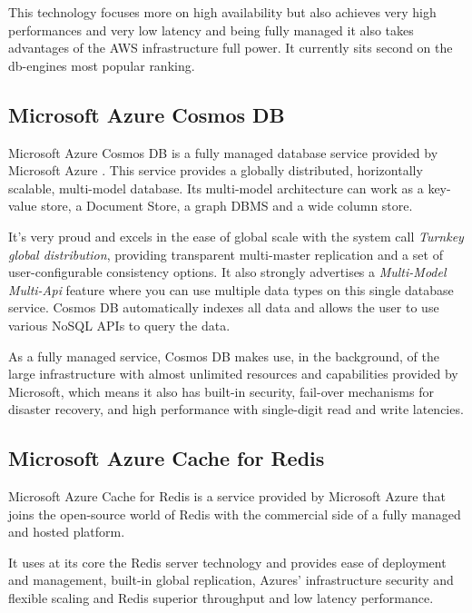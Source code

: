 This technology focuses more on high availability but also achieves very high performances and very low latency and being fully managed it also takes advantages of the \gls{AWS} infrastructure full power. It currently sits second on the db-engines \cite{db-engine:2} most popular ranking.

\subsection{Microsoft Azure Cosmos DB}
\label{ssec:microsoft_azure_cosmos_db}

Microsoft Azure Cosmos DB \cite{cosmos:1} is a fully managed database service provided by Microsoft Azure \cite{azure:1}. This service provides a globally distributed, horizontally scalable, multi-model database. Its multi-model architecture can work as a key-value store, a Document Store, a graph \gls{DBMS} and a wide column store.

It's very proud and excels in the ease of global scale with the system call \textit{Turnkey global distribution}, providing transparent multi-master replication and a set of user-configurable consistency options. It also strongly advertises a \textit{Multi-Model Multi-Api} feature where you can use multiple data types on this single database service. Cosmos DB automatically indexes all data and allows the user to use various NoSQL APIs to query the data.

As a fully managed service, Cosmos DB makes use, in the background, of the large infrastructure with almost unlimited resources and capabilities provided by Microsoft, which means it also has built-in security, fail-over mechanisms for disaster recovery, and high performance with single-digit read and write latencies.

\subsection{Microsoft Azure Cache for Redis}
\label{ssec:microsoft_azure_cache_for_redis}

Microsoft Azure Cache for Redis \cite{cache-for-redis:1} is a service provided by Microsoft Azure that joins the open-source world of Redis with the commercial side of a fully managed and hosted platform.

It uses at its core the Redis server technology and provides ease of deployment and management, built-in global replication, Azures' infrastructure security and flexible scaling and Redis superior throughput and low latency performance.


